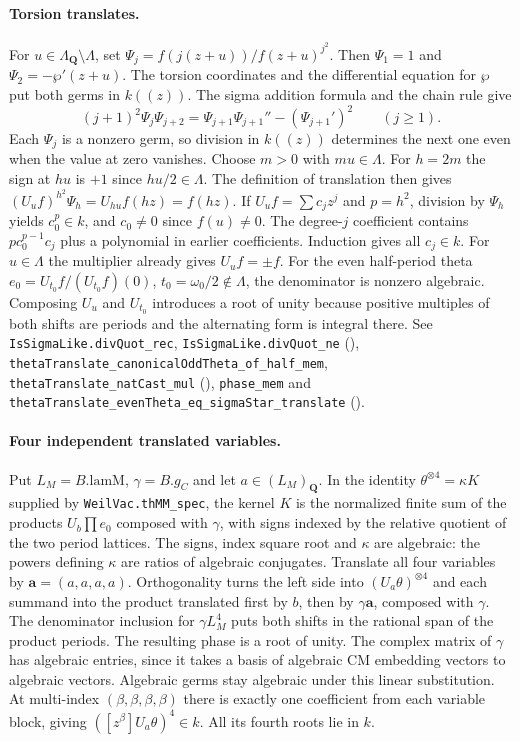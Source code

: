 \paragraph{Torsion translates.}
For $u\in\Lambda_{\mathbf Q}\setminus\Lambda$, set
$\Psi_j=f(j(z+u))/f(z+u)^{j^2}$. Then $\Psi_1=1$ and
$\Psi_2=-\wp'(z+u)$. The torsion coordinates and the differential
equation for $\wp$ put both germs in $k((z))$. The sigma addition
formula and the chain rule give
\[
 (j+1)^2\Psi_j\Psi_{j+2}
    =\Psi_{j+1}\Psi_{j+1}''-(\Psi_{j+1}')^2\qquad (j\ge1).
\]
Each $\Psi_j$ is a nonzero germ, so division in $k((z))$ determines
the next one even when the value at zero vanishes. Choose $m>0$ with
$mu\in\Lambda$. For $h=2m$ the sign at $hu$ is $+1$ since
$hu/2\in\Lambda$. The definition of translation then gives
$(U_uf)^{h^2}\Psi_h=U_{hu}f(hz)=f(hz)$. If
$U_uf=\sum c_jz^j$ and $p=h^2$, division by $\Psi_h$ yields
$c_0^p\in k$, and $c_0\ne0$ since $f(u)\ne0$. The degree-$j$ coefficient
contains $pc_0^{p-1}c_j$ plus a polynomial in earlier coefficients.
Induction gives all $c_j\in k$. For $u\in\Lambda$ the multiplier
already gives $U_uf=\pm f$. For the even half-period theta
$e_0=U_{t_0}f/(U_{t_0}f)(0)$, $t_0=\omega_0/2\notin\Lambda$,
the denominator is nonzero algebraic. Composing $U_u$ and $U_{t_0}$
introduces a root of unity because positive multiples of both shifts
are periods and the alternating form is integral there.
See \nolinkurl{IsSigmaLike.divQuot_rec}, \nolinkurl{IsSigmaLike.divQuot_ne}
(),
\nolinkurl{thetaTranslate_canonicalOddTheta_of_half_mem}, \nolinkurl{thetaTranslate_natCast_mul}
(),
\nolinkurl{phase_mem} and \nolinkurl{thetaTranslate_evenTheta_eq_sigmaStar_translate}
().

\paragraph{Four independent translated variables.}
Put $L_M=B.\mathrm{lamM}$, $\gamma=B.g_C$ and let $a\in(L_M)_{\mathbf Q}$.
In the identity $\theta^{\otimes4}=\kappa K$ supplied by
\nolinkurl{WeilVac.thMM_spec}, the kernel $K$ is the normalized finite
sum of the products $U_b\prod e_0$ composed with $\gamma$,
with signs indexed by the relative quotient of the two period lattices.
The signs, index square root and $\kappa$ are algebraic: the powers
defining $\kappa$ are ratios of algebraic conjugates. Translate all
four variables by $\mathbf a=(a,a,a,a)$. Orthogonality turns the left
side into $(U_a\theta)^{\otimes4}$ and each summand into the product
translated first by $b$, then by $\gamma\mathbf a$, composed with
$\gamma$. The denominator inclusion for $\gamma L_M^4$ puts both
shifts in the rational span of the product periods. The resulting
phase is a root of unity. The complex matrix of $\gamma$ has algebraic
entries, since it takes a basis of algebraic CM embedding vectors to
algebraic vectors. Algebraic germs stay algebraic under this linear
substitution. At multi-index $(\beta,\beta,\beta,\beta)$ there is
exactly one coefficient from each variable block, giving
$([z^\beta]U_a\theta)^4\in k$. All its fourth roots lie in $k$.

